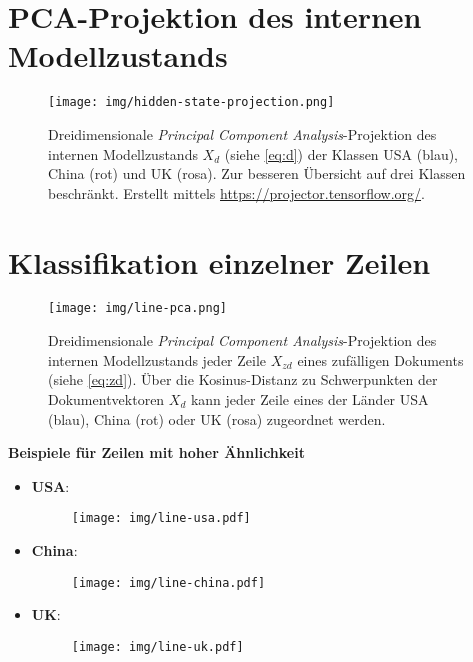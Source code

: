 \documentclass[bachelor,german]{info1thesis}
\begin{document}
\chapter{PCA-Projektion des internen Modellzustands}
\label{app:hidden-state-projection}

\begin{figure}[h!]
\centering
\texttt{[image: img/hidden-state-projection.png]}
\caption{Dreidimensionale \textit{Principal Component Analysis}-Projektion des internen Modellzustands $X_d$ (siehe \autoref{eq:d}) der Klassen USA (blau), China (rot) und UK (rosa). Zur besseren Übersicht auf drei Klassen beschränkt. Erstellt mittels \url{https://projector.tensorflow.org/}.}
\end{figure}

\chapter{Klassifikation einzelner Zeilen}
\label{app:line-projection}

\begin{figure}[h!]
\centering
\texttt{[image: img/line-pca.png]}
\caption{Dreidimensionale \textit{Principal Component Analysis}-Projektion des internen Modellzustands jeder Zeile $X_{zd}$ eines zufälligen Dokuments (siehe \autoref{eq:zd}). Über die Kosinus-Distanz zu Schwerpunkten der Dokumentvektoren $X_d$ kann jeder Zeile eines der Länder USA (blau), China (rot) oder UK (rosa) zugeordnet werden.}
\end{figure}

\textbf{Beispiele für Zeilen mit hoher Ähnlichkeit}
\begin{itemize}
\item \textbf{USA}:%
\vspace{-.5em}
\begin{figure}[h!]
\centering
\texttt{[image: img/line-usa.pdf]}
\end{figure}
\vspace{-1.5em}
\item \textbf{China}:%
\vspace{-.5em}
\begin{figure}[h!]
\centering
\texttt{[image: img/line-china.pdf]}
\end{figure}
\vspace{-1.5em}
\item \textbf{UK}:%
\vspace{-.5em}
\begin{figure}[h!]
\centering
\texttt{[image: img/line-uk.pdf]}
\end{figure}
\end{itemize}

\end{document}
